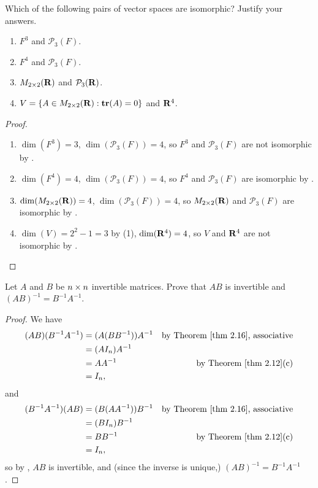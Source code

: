 \begin{exercise} \label{exercise 2.4.3}
Which of the following pairs of vector spaces are isomorphic?
Justify your answers.
\begin{enumerate}
\item \(F^3\) and \(\mathcal{P}_3(F)\).
\item \(F^4\) and \(\mathcal{P}_3(F)\).
\item \(M_{2 \times 2}(\mathbf{R})\) and \(\mathcal{P}_3(\mathbf{R})\).
\item \(V = \{ A \in M_{2 \times 2}(\mathbf{R}) : \textbf{tr}(A) = 0 \}\) and \(\mathbf{R}^4\).
\end{enumerate}
\end{exercise}

\begin{proof} \ 
\begin{enumerate}
\item \(\dim(F^3) = 3\), \(\dim(\mathcal{P}_3(F)) = 4\), so \(F^3\) and \(\mathcal{P}_3(F)\) are not isomorphic by .
\item \(\dim(F^4) = 4\), \(\dim(\mathcal{P}_3(F)) = 4\), so \(F^4\) and \(\mathcal{P}_3(F)\) are isomorphic by .
\item \(\dim(M_{2 \times 2}(\mathbf{R})) = 4\), \(\dim(\mathcal{P}_3(F)) = 4\), so \(M_{2 \times 2}(\mathbf{R})\) and \(\mathcal{P}_3(F)\) are isomorphic by .
\item \(\dim(V) = 2^2 - 1 = 3\) by \ATHM{1.19}(1), \(\dim(\mathbf{R}^4) = 4\), so \(V\) and \(\mathbf{R}^4\) are not isomorphic by \THM{2.19}.
\end{enumerate}
\end{proof}

\begin{exercise} \label{exercise 2.4.4}
Let \(A\) and \(B\) be \(n \times n\) invertible matrices.
Prove that \(AB\) is invertible and \((AB)^{-1} = B^{-1}A^{-1}\).
\end{exercise}

\begin{proof}
We have
\begin{align*}
    (AB)(B^{-1}A^{-1}) & = ( A(B B^{-1}) )A^{-1} & \text{by \THM{2.16}, associative} \\
                       & = (A I_n) A^{-1} \\
                       & = A A^{-1} & \text{by \THM{2.12}(c)} \\
                       & = I_n,
\end{align*}
and
\begin{align*}
    (B^{-1}A^{-1})(AB) & = ( B(A A^{-1}) )B^{-1} & \text{by \THM{2.16}, associative} \\
                       & = (B I_n) B^{-1} \\
                       & = B B^{-1} & \text{by \THM{2.12}(c)} \\
                       & = I_n,
\end{align*}
so by , \(AB\) is invertible, and (since the inverse is unique,) \((AB)^{-1} = B^{-1} A^{-1}\).
\end{proof}


